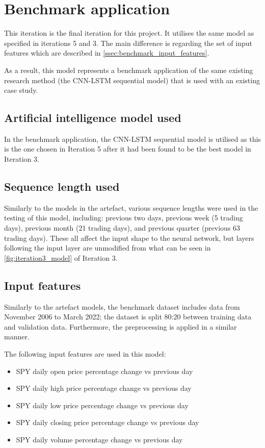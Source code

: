 \section{Benchmark application}
This iteration is the final iteration for this project. It utilises the same model as specified
in iterations 5 and 3. The main difference is regarding the set of input features which are described
in \autoref{ssec:benchmark_input_features}.

As a result, this model represents a benchmark application of the same existing research method
(the CNN-LSTM sequential model) that is used with an existing case study.

\subsection{Artificial intelligence model used}\label{ssec:benchmark_ai_model}
In the benchmark application, the CNN-LSTM sequential model is utilised as this is the one
chosen in Iteration 5 after it had been found to be the best model in Iteration 3.

\subsection{Sequence length used}
Similarly to the models in the artefact, various sequence lengths were used in the testing of this model,
including: previous two days, previous week (5 trading days), previous month (21 trading days), and previous quarter
(previous 63 trading days).
These all affect the input shape to the neural network, but layers following the input layer are unmodified from
what can be seen in \autoref{fig:iteration3_model} of Iteration 3.

\subsection{Input features}\label{ssec:benchmark_input_features}
Similarly to the artefact models, the benchmark dataset includes data from November 2006 to March 2022;
the dataset is split 80:20 between training data and validation data. Furthermore, the preprocessing is
applied in a similar manner.

The following input features are used in this model:

\begin{itemize}
    \item SPY daily open price percentage change vs previous day
    \item SPY daily high price percentage change vs previous day
    \item SPY daily low price percentage change vs previous day
    \item SPY daily closing price percentage change vs previous day
    \item SPY daily volume percentage change vs previous day
\end{itemize}

